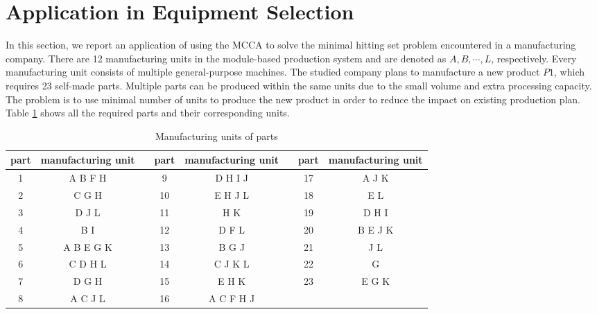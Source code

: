 \section{Application in Equipment Selection}
In this section, we report an application of using the MCCA to solve the minimal hitting set problem encountered in a manufacturing company.
There are 12 manufacturing units in the module-based production system and are denoted as $A, B, \cdots, L$, respectively.
Every manufacturing unit consists of multiple general-purpose machines.
The studied company plans to manufacture a new product $P1$, which requires 23 self-made parts.
Multiple parts can be produced within the same units due to the small volume and extra processing capacity.
The problem is to use minimal number of units to produce the new product in order to reduce the impact on existing production plan.
Table \ref{tab:tab4} shows all the required parts and their corresponding units.


\begin{table}[h!]
	\begin{center}
		\caption{Manufacturing units of parts}
		\label{tab:tab4}
		\begin{tabular}{cc|c|cc|c|cc}
			\hline
			part & manufacturing unit && part & manufacturing unit && part & manufacturing unit \\
			\hline
			1 & A B F H   && 9  & D H I J   && 17 & A J K \\
			2 & C G H     && 10 & E H J L   && 18 & E L \\
			3 & D J L     && 11 & H K       && 19 & D H I \\
			4 & B I       && 12 & D F L     && 20 & B E J K \\
			5 & A B E G K && 13 & B G J     && 21 & J L \\
			6 & C D H L   && 14 & C J K L   && 22 & G \\
			7 & D G H     && 15 & E H K     && 23 & E G K \\
			8 & A C J L   && 16 & A C F H J &&    & \\
			\hline
		\end{tabular}
	\end{center}
\end{table}


